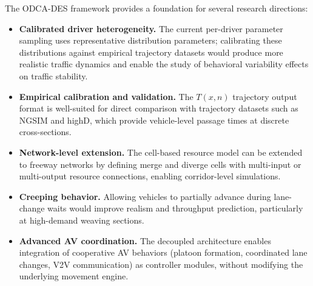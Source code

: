 \documentclass[review,authoryear]{elsarticle}
\begin{document}
The ODCA-DES framework provides a foundation for several research directions:

\begin{itemize}
    \item \textbf{Calibrated driver heterogeneity.} The current per-driver parameter sampling uses representative distribution parameters; calibrating these distributions against empirical trajectory datasets would produce more realistic traffic dynamics and enable the study of behavioral variability effects on traffic stability.

    \item \textbf{Empirical calibration and validation.} The $T(x,n)$ trajectory output format is well-suited for direct comparison with trajectory datasets such as NGSIM and highD, which provide vehicle-level passage times at discrete cross-sections.

    \item \textbf{Network-level extension.} The cell-based resource model can be extended to freeway networks by defining merge and diverge cells with multi-input or multi-output resource connections, enabling corridor-level simulations.

    \item \textbf{Creeping behavior.} Allowing vehicles to partially advance during lane-change waits would improve realism and throughput prediction, particularly at high-demand weaving sections.

    \item \textbf{Advanced AV coordination.} The decoupled architecture enables integration of cooperative AV behaviors (platoon formation, coordinated lane changes, V2V communication) as controller modules, without modifying the underlying movement engine.
\end{itemize}




\end{document}
